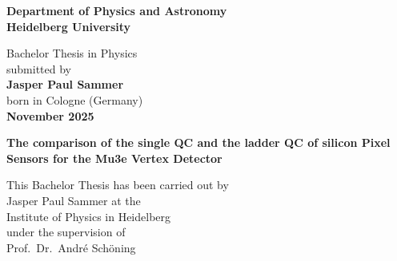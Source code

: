 \begin{titlepage}
\begin{center}
 
\Large\textbf{Department of Physics and Astronomy\\
Heidelberg University}

\vspace{18cm}

\normalsize
Bachelor Thesis in Physics\\
submitted by\\
\vspace{0.5cm}
\Large\textbf{Jasper Paul Sammer}\\
\normalsize
\vspace{0.5cm}
born in Cologne (Germany)\\
\vspace{0.5cm}
\Large\textbf{November 2025}
\normalsize

\newpage




\Large\textbf{The comparison of the single QC and the ladder QC of silicon Pixel Sensors for the Mu3e Vertex Detector}

\vspace{20cm}

\normalsize
This Bachelor Thesis has been carried out by\\
Jasper Paul Sammer at the\\
Institute of Physics in Heidelberg\\
under the supervision of\\
Prof.\ Dr.\ André Schöning 

\vfill
\end{center}

\end{titlepage}
